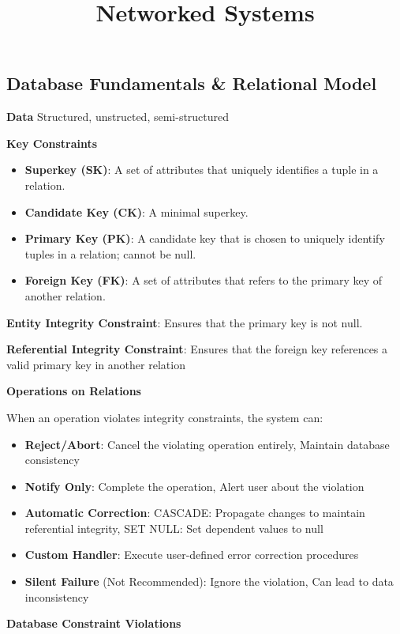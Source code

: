 \documentclass{article}
\title{Networked Systems}
\author{}
\date{}
\begin{document}
\footnotesize

\subsection*{Database Fundamentals \& Relational Model}

\noindent \textbf{Data} Structured, unstructed, semi-structured

\noindent \textbf{Key Constraints}

\begin{itemize}
    \item \textbf{Superkey (SK)}: A set of attributes that uniquely identifies a tuple in a relation.
    \item \textbf{Candidate Key (CK)}: A minimal superkey.
    \item \textbf{Primary Key (PK)}: A candidate key that is chosen to uniquely identify tuples in a relation; cannot be null.
    \item \textbf{Foreign Key (FK)}: A set of attributes that refers to the primary key of another relation.
\end{itemize}

\noindent \textbf{Entity Integrity Constraint}: Ensures that the primary key is not null.

\noindent \textbf{Referential Integrity Constraint}: Ensures that the foreign key references a valid primary key in another relation

\noindent \textbf{Operations on Relations}

\noindent When an operation violates integrity constraints, the system can:

\begin{itemize}
    \item \textbf{Reject/Abort}: Cancel the violating operation entirely, Maintain database consistency
    \item \textbf{Notify Only}: Complete the operation, Alert user about the violation
    \item \textbf{Automatic Correction}: CASCADE: Propagate changes to maintain referential integrity, SET NULL: Set dependent values to null
    \item \textbf{Custom Handler}: Execute user-defined error correction procedures
    \item \textbf{Silent Failure} (Not Recommended): Ignore the violation, Can lead to data inconsistency
\end{itemize}

\noindent \textbf{Database Constraint Violations}
\end{document}
